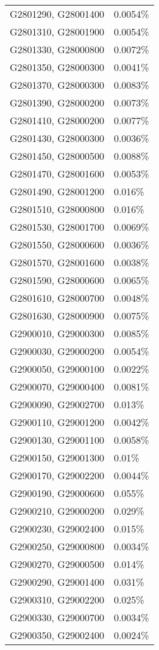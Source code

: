 \begin{longtable}[]{@{}ll@{}}
G2801290, G28001400 & 0.0054\% \\
G2801310, G28001900 & 0.0054\% \\
G2801330, G28000800 & 0.0072\% \\
G2801350, G28000300 & 0.0041\% \\
G2801370, G28000300 & 0.0083\% \\
G2801390, G28000200 & 0.0073\% \\
G2801410, G28000200 & 0.0077\% \\
G2801430, G28000300 & 0.0036\% \\
G2801450, G28000500 & 0.0088\% \\
G2801470, G28001600 & 0.0053\% \\
G2801490, G28001200 & 0.016\% \\
G2801510, G28000800 & 0.016\% \\
G2801530, G28001700 & 0.0069\% \\
G2801550, G28000600 & 0.0036\% \\
G2801570, G28001600 & 0.0038\% \\
G2801590, G28000600 & 0.0065\% \\
G2801610, G28000700 & 0.0048\% \\
G2801630, G28000900 & 0.0075\% \\
G2900010, G29000300 & 0.0085\% \\
G2900030, G29000200 & 0.0054\% \\
G2900050, G29000100 & 0.0022\% \\
G2900070, G29000400 & 0.0081\% \\
G2900090, G29002700 & 0.013\% \\
G2900110, G29001200 & 0.0042\% \\
G2900130, G29001100 & 0.0058\% \\
G2900150, G29001300 & 0.01\% \\
G2900170, G29002200 & 0.0044\% \\
G2900190, G29000600 & 0.055\% \\
G2900210, G29000200 & 0.029\% \\
G2900230, G29002400 & 0.015\% \\
G2900250, G29000800 & 0.0034\% \\
G2900270, G29000500 & 0.014\% \\
G2900290, G29001400 & 0.031\% \\
G2900310, G29002200 & 0.025\% \\
G2900330, G29000700 & 0.0034\% \\
G2900350, G29002400 & 0.0024\% \\

\end{longtable}
